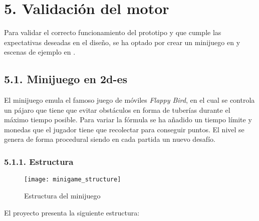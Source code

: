 \chapter*{5. Validación del motor}\label{cap:validation}

Para validar el correcto funcionamiento del prototipo y que cumple las expectativas deseadas en el diseño, se ha optado
por crear un minijuego en  y escenas de ejemplo en .

\section*{5.1. Minijuego en \gls{2d-es}}\label{sec:minigame}

El minijuego emula el famoso juego de móviles \textit{Flappy Bird}\cite{flappy-bird}, en el cual se controla un pájaro
que tiene que evitar obstáculos en forma de tuberías durante el máximo tiempo posible. Para variar la fórmula
se ha añadido un tiempo límite y monedas que el jugador tiene que recolectar para conseguir puntos. El nivel se
genera de forma procedural siendo en cada partida un nuevo desafío.

\subsection*{5.1.1. Estructura}\label{sec:minigame_structure}

\begin{figure}[h!]
    \centering
    \texttt{[image: minigame\_structure]}
    \caption{Estructura del minijuego}
    \label{minigame_structure}
\end{figure}
El proyecto presenta la siguiente estructura:

